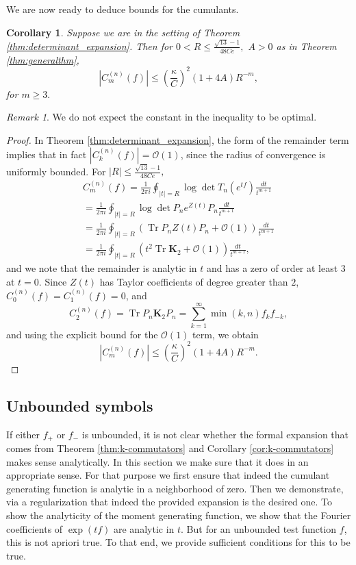 \documentclass[11pt]{amsart}
\theoremstyle{plain}
\newtheorem{corollary}[theorem]{Corollary}
\theoremstyle{remark}
\newtheorem{remark}[theorem]{Remark}
\DeclareMathOperator{\Tr}{Tr}
\numberwithin{equation}{section}
\begin{document}
We are now ready to deduce bounds for the cumulants.

\begin{corollary}\label{cor:bounds_in_bounded}
Suppose we are in the setting of Theorem \ref{thm:determinant_expansion}. Then for $0<R\leq\frac{\sqrt{13}-1}{48Ce},$ $A>0$ as in Theorem \ref{thm:generalthm},
\begin{equation}
|C_m^{(n)}(f)|\leq 
\left(\frac{\kappa}{C}\right)^2(1+4A) R^{-m},
\end{equation}
for $m\geq 3.$
\end{corollary}
\begin{remark}
We do not expect the constant in the inequality to be optimal. 
\end{remark}
\begin{proof}
In Theorem \ref{thm:determinant_expansion}, the form of the remainder term implies that in fact $|C_k^{(n)}(f)|=\mathcal{O}(1)$, since the radius of convergence is uniformly bounded. For 
$|R|\leq\frac{\sqrt{13}-1}{48Ce},$ 
%
\begin{multline}
C_{m}^{(n)}(f)
%
%
%
= \frac{1}{2\pi i}\oint_{|t|=R}\log \det T_n(e^{tf})\frac{dt}{t^{m+1}}
\\=  \frac{1}{2\pi i}\oint_{|t|=R}\log \det P_n e^{Z(t)}P_n\frac{dt}{t^{m+1}}
\\= \frac{1}{2\pi i}\oint_{|t|=R} 
\left(\Tr  P_nZ(t)P_n +\mathcal{O}(1)\right)\frac{dt}{t^{m+1}}
\\= \frac{1}{2\pi i}\oint_{|t|=R} \left(t^2\Tr  \mathbf{K}_2 +\mathcal{O}(1)\right)\frac{dt}{t^{m+1}},
\end{multline}
and we note that the remainder is analytic in $t$ and has a zero of order at least $3$ at $t=0$.
Since $Z(t)$ has Taylor coefficients of degree greater than $2$, $C_0^{(n)}(f)=C_{1}^{(n)}(f)=0$, and
$$
C_{2}^{(n)}(f)=\Tr P_n \mathbf{K}_2P_n=\sum_{k=1}^{\infty}\min(k,n) f_k f_{-k},
$$
and using the explicit bound for the $\mathcal{O}(1)$ term, we obtain
$$|C_{m}^{(n)}(f)|
\leq \left(\frac{\kappa}{C}\right)^2(1+4A) R^{-m}.
$$
%
\end{proof}

\subsection{Unbounded symbols}\label{sec:unbounded_cumulants}
If either $f_+$ or $f_-$ is unbounded, it is not clear whether the formal expansion that comes from Theorem \ref{thm:k-commutators} and Corollary \ref{cor:k-commutators} makes sense analytically. In this section we make sure that it does in an appropriate sense. For that purpose we first ensure that indeed the cumulant generating function is analytic in a neighborhood of zero. Then we demonstrate, via a regularization that indeed the provided expansion is the desired one.  
%
%
To show the analyticity of the moment generating function, we show that the Fourier coefficients of $\exp(tf)$ are analytic in $t$. 
But for an unbounded test function $f$, this is not apriori true. To that end, we provide sufficient conditions for this to be true. 
\end{document}

